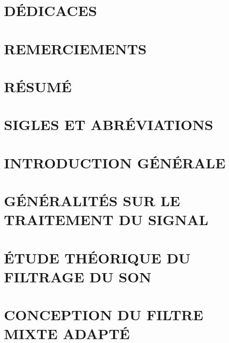 \documentclass[12pt,twoside]{book}
\begin{document}
\begin{titlepage}

\end{titlepage}

\renewcommand{\bibname}{Bibliographie}
\renewcommand{\chaptername}{Chapitre}
\renewcommand{\appendixtocname}{ANNEXES}
\renewcommand{\appendixpagename}{ANNEXES}
\renewcommand{\contentsname}{Table des matières}
\renewcommand{\listfigurename}{Liste des figures}
\frontmatter
\chapter*{DÉDICACES}

\chapter*{REMERCIEMENTS}

\chapter*{RÉSUMÉ}

\chapter*{SIGLES ET ABRÉVIATIONS}

\tableofcontents
\listoffigures

\mainmatter

\graphicspath{{./Images/}}

\chapter*{INTRODUCTION GÉNÉRALE}

\chapter{GÉNÉRALITÉS SUR LE TRAITEMENT DU SIGNAL}

\chapter{ÉTUDE THÉORIQUE DU FILTRAGE DU SON}

\chapter{CONCEPTION DU FILTRE MIXTE ADAPTÉ}

\end{document}
